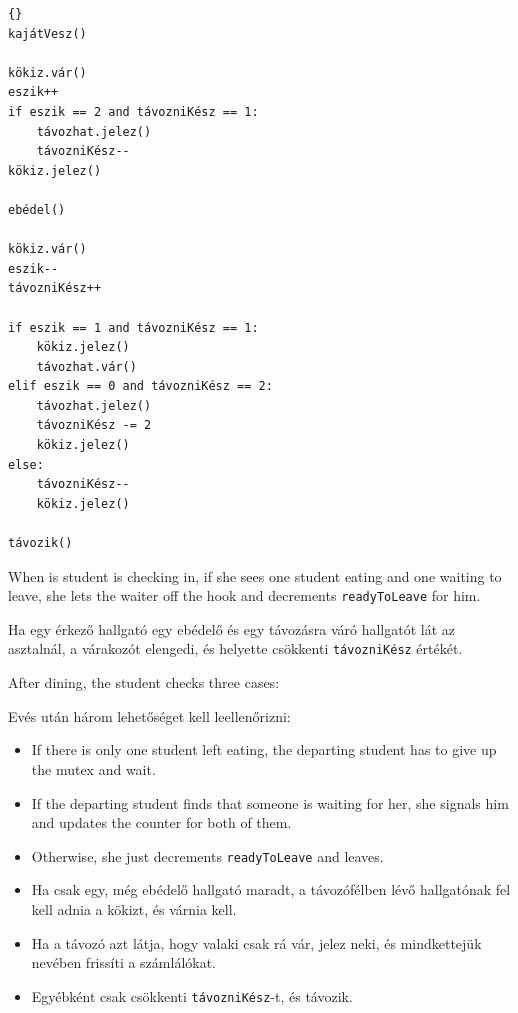 \documentclass{book}
\begin{document}
\begin{lstlisting}[title={Egyetemi menza megoldás}]{}
kajátVesz()

kökiz.vár()
eszik++
if eszik == 2 and távozniKész == 1:
    távozhat.jelez()
    távozniKész--
kökiz.jelez()

ebédel()

kökiz.vár()
eszik--
távozniKész++

if eszik == 1 and távozniKész == 1:
    kökiz.jelez()
    távozhat.vár()
elif eszik == 0 and távozniKész == 2:
    távozhat.jelez()
    távozniKész -= 2
    kökiz.jelez()
else:
    távozniKész--
    kökiz.jelez()

távozik()
\end{lstlisting}

When is student is checking in, if she sees one student
eating and one waiting to leave, she lets the waiter off the
hook and decrements {\tt readyToLeave} for him.

Ha egy érkező hallgató egy ebédelő és egy távozásra váró
hallgatót lát az asztalnál, a várakozót elengedi, és helyette
csökkenti {\tt távozniKész} értékét.

After dining, the student checks three cases:

Evés után három lehetőséget kell leellenőrizni:

\begin{itemize}

\item If there is only one student left eating, the departing student
has to give up the mutex and wait.

\item If the departing student finds that someone is waiting for
her, she signals him and updates the counter for both of them.

\item Otherwise, she just decrements {\tt readyToLeave} and leaves.

\end{itemize}

\begin{itemize}

\item Ha csak egy, még ebédelő hallgató maradt, a távozófélben
lévő hallgatónak fel kell adnia a kökizt, és várnia kell.

\item Ha a távozó azt látja, hogy valaki csak rá vár, jelez neki,
és mindkettejük nevében frissíti a számlálókat.

\item Egyébként csak csökkenti {\tt távozniKész}-t, és távozik.

\end{itemize}
\end{document}
